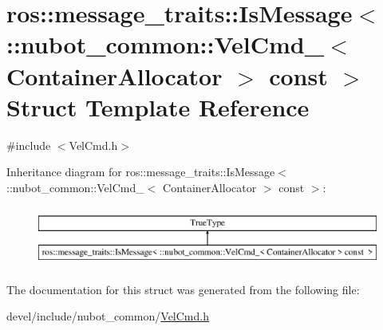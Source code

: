 \hypertarget{structros_1_1message__traits_1_1IsMessage_3_01_1_1nubot__common_1_1VelCmd___3_01ContainerAllocator_01_4_01const_01_01_4}{\section{ros\-:\-:message\-\_\-traits\-:\-:Is\-Message$<$ \-:\-:nubot\-\_\-common\-:\-:Vel\-Cmd\-\_\-$<$ Container\-Allocator $>$ const $>$ Struct Template Reference}
\label{structros_1_1message__traits_1_1IsMessage_3_01_1_1nubot__common_1_1VelCmd___3_01ContainerAllocator_01_4_01const_01_01_4}
}


{\ttfamily \#include $<$Vel\-Cmd.\-h$>$}

Inheritance diagram for ros\-:\-:message\-\_\-traits\-:\-:Is\-Message$<$ \-:\-:nubot\-\_\-common\-:\-:Vel\-Cmd\-\_\-$<$ Container\-Allocator $>$ const $>$\-:\begin{figure}[H]
\begin{center}
\leavevmode
\includegraphics[height=2.000000cm]{structros_1_1message__traits_1_1IsMessage_3_01_1_1nubot__common_1_1VelCmd___3_01ContainerAllocator_01_4_01const_01_01_4}
\end{center}
\end{figure}


The documentation for this struct was generated from the following file\-:\begin{DoxyCompactItemize}
\item 
devel/include/nubot\-\_\-common/\hyperlink{VelCmd_8h}{Vel\-Cmd.\-h}\end{DoxyCompactItemize}
